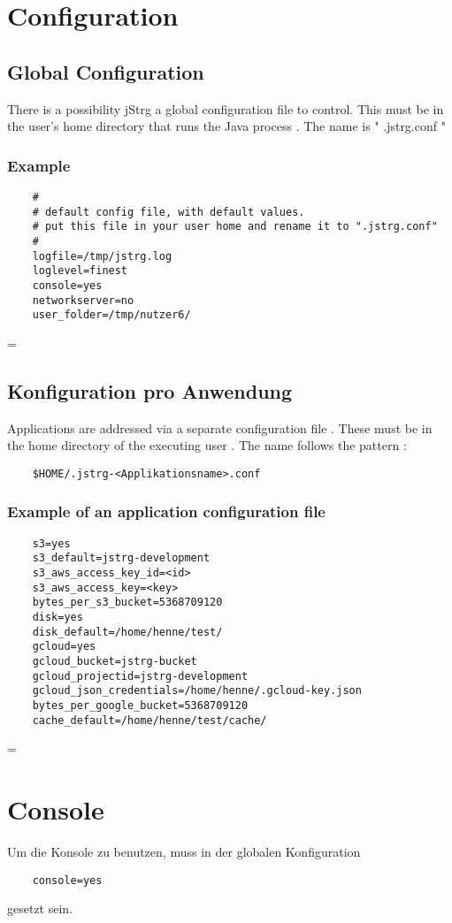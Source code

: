 \documentclass
[   oneside,         %
    12pt,            %
    DIV15,           %
    headsepline,     %
    footsepline,     %
    openright,       %
    a4paper,         %
    abstracton,      %
    titlepage,       %
    headinclude,     %
]   {scrreprt}       %
\newenvironment{absolutelynopagebreak}
{\par\nobreak\vfil\penalty0\vfilneg
	\vtop\bgroup}
{\par\xdef\tpd{\the\prevdepth}\egroup
	\prevdepth=\tpd}
\begin{document}
	\section{Configuration}
	\subsection{Global Configuration}
         There is a possibility jStrg a global configuration file to control. This must be in the user's home directory that runs the Java process . The name is " .jstrg.conf "
	\begin{absolutelynopagebreak}
	\subsubsection{Example}
	\begin{lstlisting}
	#
	# default config file, with default values.
	# put this file in your user home and rename it to ".jstrg.conf"
	#
	logfile=/tmp/jstrg.log
	loglevel=finest
	console=yes
	networkserver=no
	user_folder=/tmp/nutzer6/ 
	\end{lstlisting}
	\end{absolutelynopagebreak}
	\subsection{Konfiguration pro Anwendung}
	Applications are addressed via a separate configuration file . These must be in the home directory of the executing user . The name follows the pattern :
	\begin{lstlisting}
	$HOME/.jstrg-<Applikationsname>.conf
	\end{lstlisting}
	\begin{absolutelynopagebreak}
	\subsubsection{Example of an application configuration file}
	\begin{lstlisting}
	s3=yes
	s3_default=jstrg-development
	s3_aws_access_key_id=<id>
	s3_aws_access_key=<key>
	bytes_per_s3_bucket=5368709120
	disk=yes
	disk_default=/home/henne/test/
	gcloud=yes
	gcloud_bucket=jstrg-bucket
	gcloud_projectid=jstrg-development
	gcloud_json_credentials=/home/henne/.gcloud-key.json
	bytes_per_google_bucket=5368709120
	cache_default=/home/henne/test/cache/
	\end{lstlisting}
	\end{absolutelynopagebreak}
	\section{Console}
	Um die Konsole zu benutzen, muss in der globalen Konfiguration 
	\begin{lstlisting}
	console=yes
	\end{lstlisting}
	gesetzt sein.
\end{document}
